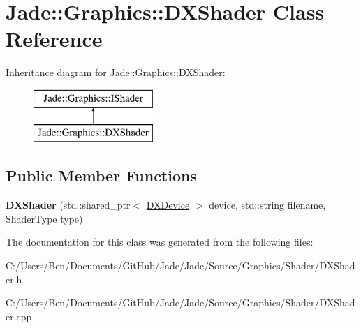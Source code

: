 \hypertarget{class_jade_1_1_graphics_1_1_d_x_shader}{}\section{Jade\+:\+:Graphics\+:\+:D\+X\+Shader Class Reference}
\label{class_jade_1_1_graphics_1_1_d_x_shader}
Inheritance diagram for Jade\+:\+:Graphics\+:\+:D\+X\+Shader\+:\begin{figure}[H]
\begin{center}
\leavevmode
\includegraphics[height=2.000000cm]{class_jade_1_1_graphics_1_1_d_x_shader}
\end{center}
\end{figure}
\subsection*{Public Member Functions}
\begin{DoxyCompactItemize}
\item 
\hypertarget{class_jade_1_1_graphics_1_1_d_x_shader_a6e46891491201994d504224a95f4e693}{}{\bfseries D\+X\+Shader} (std\+::shared\+\_\+ptr$<$ \hyperlink{class_jade_1_1_graphics_1_1_d_x_device}{D\+X\+Device} $>$ device, std\+::string filename, Shader\+Type type)\label{class_jade_1_1_graphics_1_1_d_x_shader_a6e46891491201994d504224a95f4e693}

\end{DoxyCompactItemize}


The documentation for this class was generated from the following files\+:\begin{DoxyCompactItemize}
\item 
C\+:/\+Users/\+Ben/\+Documents/\+Git\+Hub/\+Jade/\+Jade/\+Source/\+Graphics/\+Shader/D\+X\+Shader.\+h\item 
C\+:/\+Users/\+Ben/\+Documents/\+Git\+Hub/\+Jade/\+Jade/\+Source/\+Graphics/\+Shader/D\+X\+Shader.\+cpp\end{DoxyCompactItemize}
